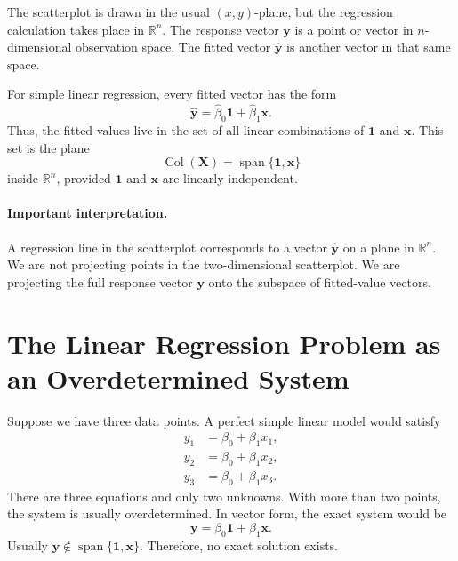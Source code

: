 The scatterplot is drawn in the usual \((x,y)\)-plane, but the regression calculation takes place in \(\mathbb{R}^n\).  The response vector \(\mathbf{y}\) is a point or vector in \(n\)-dimensional observation space.  The fitted vector \(\widehat{\mathbf{y}}\) is another vector in that same space.

For simple linear regression, every fitted vector has the form
\begin{equation}
  \widehat{\mathbf{y}}
  =\widehat{\beta}_0\mathbf{1}+\widehat{\beta}_1\mathbf{x}.
  \label{eq:ch7-slr-fitted-linear-combination}
\end{equation}
Thus, the fitted values live in the set of all linear combinations of \(\mathbf{1}\) and \(\mathbf{x}\).  This set is the plane
\begin{equation}
  \operatorname{Col}(\mathbf{X})=\operatorname{span}\{\mathbf{1},\mathbf{x}\}
\end{equation}
inside \(\mathbb{R}^n\), provided \(\mathbf{1}\) and \(\mathbf{x}\) are linearly independent.

\paragraph{Important interpretation.}
A regression line in the scatterplot corresponds to a vector \(\widehat{\mathbf{y}}\) on a plane in \(\mathbb{R}^n\).  We are not projecting points in the two-dimensional scatterplot.  We are projecting the full response vector \(\mathbf{y}\) onto the subspace of fitted-value vectors.

\section{The Linear Regression Problem as an Overdetermined System}

Suppose we have three data points.  A perfect simple linear model would satisfy
\begin{align}
  y_1 &= \beta_0+\beta_1x_1, \\
  y_2 &= \beta_0+\beta_1x_2, \\
  y_3 &= \beta_0+\beta_1x_3.
\end{align}
There are three equations and only two unknowns.  With more than two points, the system is usually overdetermined.  In vector form, the exact system would be
\begin{equation}
  \mathbf{y}=\beta_0\mathbf{1}+\beta_1\mathbf{x}.
\end{equation}
Usually \(\mathbf{y}\notin\operatorname{span}\{\mathbf{1},\mathbf{x}\}\).  Therefore, no exact solution exists.

